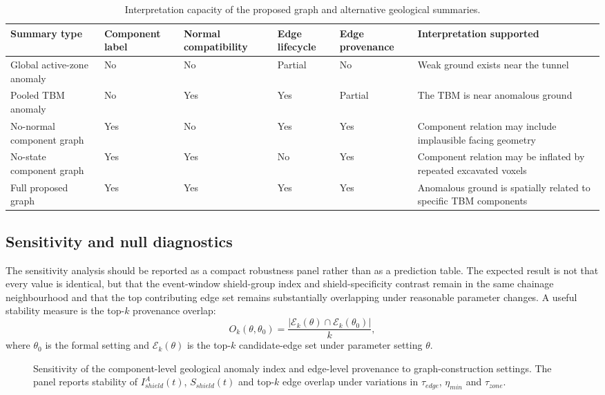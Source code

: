 \begin{table}[!htbp]
\small
\centering
\caption{Interpretation capacity of the proposed graph and alternative geological summaries.}
\label{tab:representation_comparison}
\begin{tabular}{@{}p{}p{}p{}p{}p{}p{}@{}}
\toprule
Summary type & Component label & Normal compatibility & Edge lifecycle & Edge provenance & Interpretation supported \\
\midrule
Global active-zone anomaly & No & No & Partial & No & Weak ground exists near the tunnel \\
Pooled TBM anomaly & No & Yes & Yes & Partial & The TBM is near anomalous ground \\
No-normal component graph & Yes & No & Yes & Yes & Component relation may include implausible facing geometry \\
No-state component graph & Yes & Yes & No & Yes & Component relation may be inflated by repeated excavated voxels \\
Full proposed graph & Yes & Yes & Yes & Yes & Anomalous ground is spatially related to specific TBM components \\
\bottomrule
\end{tabular}
\end{table}

\subsection{Sensitivity and null diagnostics}
The sensitivity analysis should be reported as a compact robustness panel rather than as a prediction table. The expected result is not that every value is identical, but that the event-window shield-group index and shield-specificity contrast remain in the same chainage neighbourhood and that the top contributing edge set remains substantially overlapping under reasonable parameter changes. A useful stability measure is the top-$k$ provenance overlap:
\begin{equation}
O_k(\theta,\theta_0)=\frac{|\mathcal{E}_k(\theta)\cap\mathcal{E}_k(\theta_0)|}{k},
\end{equation}
where $\theta_0$ is the formal setting and $\mathcal{E}_k(\theta)$ is the top-$k$ candidate-edge set under parameter setting $\theta$.

\begin{figure}[!htbp]
\centering
{}
\caption{Sensitivity of the component-level geological anomaly index and edge-level provenance to graph-construction settings. The panel reports stability of $I_{shield}^{A}(t)$, $S_{shield}(t)$ and top-$k$ edge overlap under variations in $\tau_{edge}$, $\eta_{min}$ and $\tau_{zone}$.}
\label{fig:sensitivity}
\end{figure}

